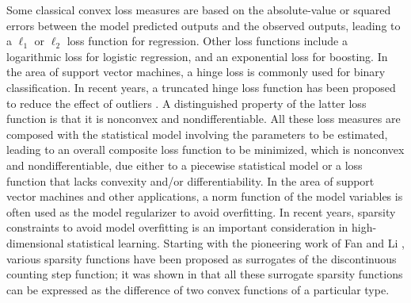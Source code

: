 \documentclass{siamart}
\begin{document}
Some classical convex loss measures
are based on the absolute-value or squared errors between the model predicted outputs and the
observed outputs, leading to a $\ell_1$ %
or $\ell_2$ loss function for regression.  Other loss functions include a logarithmic loss for logistic regression,
and an exponential loss for boosting.  In the area of support vector machines, a hinge loss is commonly
used for binary classification.
In recent years, a truncated hinge loss function has been proposed to reduce the effect of outliers
\cite{ZhangPhamFuLiu17}.  A distinguished property of the latter loss function is that it is nonconvex and
nondifferentiable.  All these loss measures are composed with the statistical model
involving the parameters to be estimated, leading to an overall composite loss function to be minimized, which is nonconvex
and nondifferentiable, due either to a piecewise statistical model or a loss function that lacks convexity and/or differentiability.
In the area of support vector machines and other applications, a norm function of
the model variables is often used as the model regularizer to avoid overfitting.   In recent years,
sparsity constraints to avoid model overfitting \cite{HastieTibshiraniWainwright15} is an important consideration in
high-dimensional statistical learning.
Starting with the pioneering work of Fan and Li \cite{FanLi01}, various sparsity functions have been proposed as surrogates of the discontinuous
counting step function; it was shown in \cite{AhnPangXin17,LeThiPhamVo15} that all these surrogate sparsity functions can be expressed as
the difference of two convex functions of a particular type.
\end{document}
